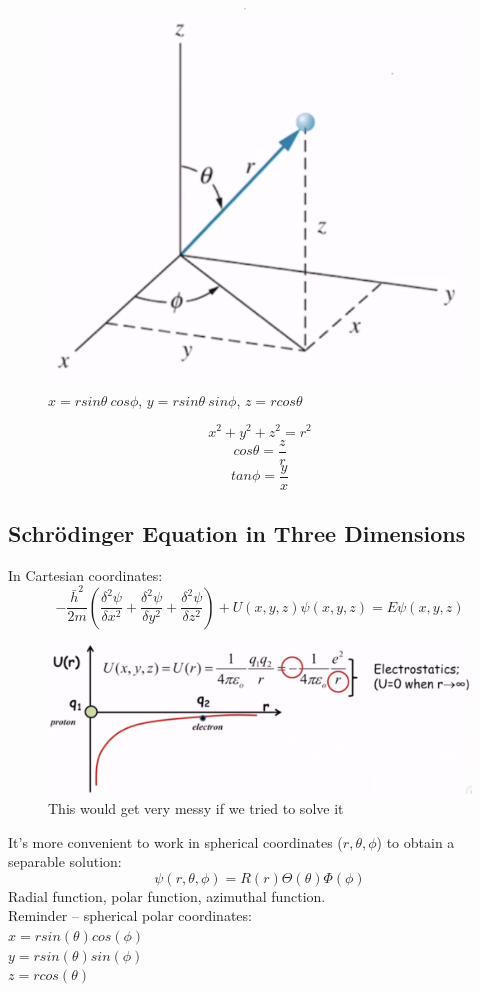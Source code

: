 \documentclass[class=article,crop=false]{standalone}
\begin{document}
\begin{figure}[h!]
	\centering
	\includegraphics[width=0.5\linewidth]{./Images/spherical_coordinates.png}
	\caption{$x = rsin\theta\ cos\phi$, $y = rsin\theta\ sin\phi$, $z = rcos\theta$}
\end{figure}

$$ x^2 + y^2 + z^2 = r^2 $$
$$ cos\theta = \frac{z}{r} $$
$$ tan\phi = \frac{y}{x} $$


\subsection{Schrödinger Equation in Three Dimensions}
In Cartesian coordinates:
$$ -\frac{\bar{h}^2}{2m} \left(\frac{\delta^2\psi}{\delta x^2} + \frac{\delta^2\psi}{\delta y^2} + \frac{\delta^2\psi}{\delta z^2} \right) + U(x, y, z) \psi(x, y, z) = E \psi(x, y, z) $$ 

\begin{figure}[h!]
	\centering
	\includegraphics[width=.8\linewidth]{./Images/electrostatics.png}
	\caption{This would get very messy if we tried to solve it}
\end{figure}

It's more convenient to work in spherical coordinates ($r, \theta, \phi$) to obtain a separable solution:
$$\psi(r, \theta, \phi) = R(r) \Theta(\theta) \Phi(\phi) $$
Radial function, polar function, azimuthal function. \\

Reminder -- spherical polar coordinates:\\
$ x = rsin(\theta) cos(\phi) $ \\
$ y = rsin(\theta) sin(\phi) $ \\
$ z = rcos(\theta) $ \\
\end{document}
